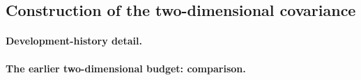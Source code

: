 

\subsection{Construction of the two-dimensional covariance}\label{recsec:twod-covariance}

\paragraph{Development-history detail.}

\paragraph{The earlier two-dimensional budget: comparison.}

